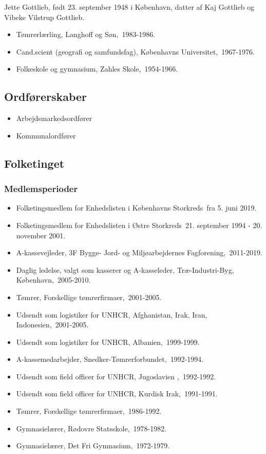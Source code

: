 \documentclass[11pt, a4paper]{awesome-cv}
\begin{document}
\makecvheader[R]
\makelettertitle
\begin{cvletter}
Jette Gottlieb, født 23. september 1948 i København, datter af Kaj Gottlieb og Vibeke Vilstrup Gottlieb.

\begin{itemize}
\item Tømrerlærling, Langhoff og Søn, 1983-1986.
\item Cand.scient (geografi og samfundsfag), Københavns Universitet, 1967-1976.
\item Folkeskole og gymnasium, Zahles Skole, 1954-1966.
\end{itemize}
\subsection*{Ordførerskaber}
\begin{itemize}
\item Arbejdsmarkedsordfører
\item Kommunalordfører
\end{itemize}
\subsection*{Folketinget}
\subsubsection*{Medlemsperioder}
\begin{itemize}
\item Folketingsmedlem for Enhedslisten i Københavns Storkreds fra 5. juni 2019.
\item Folketingsmedlem for Enhedslisten i Østre Storkreds 21. september 1994 - 20. november 2001.
\end{itemize}
\begin{itemize}
\item A-kassevejleder, 3F Bygge- Jord- og Miljøarbejdernes Fagforening, 2011-2019.
\item Daglig ledelse, valgt som kasserer og A-kasseleder, Træ-Industri-Byg, København, 2005-2010.
\item Tømrer, Forskellige tømrerfirmaer, 2001-2005.
\item Udsendt som logistiker for UNHCR, Afghanistan, Irak, Iran, Indonesien, 2001-2005.
\item Udsendt som logistiker for UNHCR, Albanien, 1999-1999.
\item A-kassemedarbejder, Snedker-Tømrerforbundet, 1992-1994.
\item Udsendt som field officer for UNHCR, Jugoslavien , 1992-1992.
\item Udsendt som field officer for UNHCR, Kurdisk Irak, 1991-1991.
\item Tømrer, Forskellige tømrerfirmaer, 1986-1992.
\item Gymnasielærer, Rødovre Statsskole, 1978-1982.
\item Gymnasielærer, Det Fri Gymnasium, 1972-1979.
\end{itemize}
\end{cvletter}
\end{document}

